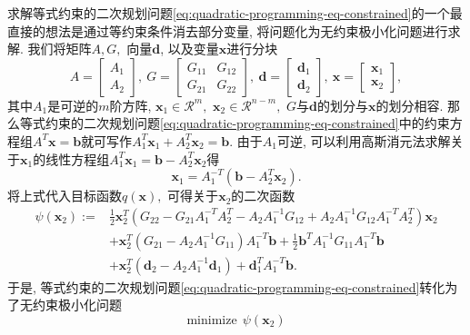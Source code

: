 \documentclass{SBCbookchapter}
\newcommand{\V}[1]{{\bm{#1}}}
\newcommand{\R}{\mathcal{R}}
\numberwithin{equation}{section}
\begin{document}
求解等式约束的二次规划问题\eqref{eq:quadratic-programming-eq-constrained}的一个最直接的想法是通过等约束条件消去部分变量, 将问题化为无约束极小化问题进行求解. 我们将矩阵$A, G,$ 向量$\V{d}$, 以及变量$\V{x}$进行分块
\begin{equation*}
A = \begin{bmatrix} A_1 \\ A_2 \end{bmatrix}, ~ G = \begin{bmatrix} G_{11} & G_{12} \\ G_{21} & G_{22} \end{bmatrix}, ~ \V{d} = \begin{bmatrix} \V{d}_1 \\ \V{d}_2 \end{bmatrix}, ~ \V{x} = \begin{bmatrix} \V{x}_1 \\ \V{x}_2 \end{bmatrix},
\end{equation*}
其中$A_1$是可逆的$m$阶方阵, $\V{x}_1 \in \R^{m},$ $\V{x}_2 \in \R^{n-m},$ $G$与$\V{d}$的划分与$\V{x}$的划分相容. 那么等式约束的二次规划问题\eqref{eq:quadratic-programming-eq-constrained}中的约束方程组$A^T \V{x} = \V{b}$就可写作$A_1^T \V{x}_1 + A_2^T \V{x}_2 = \V{b}.$ 由于$A_1$可逆, 可以利用高斯消元法求解关于$\V{x}_1$的线性方程组$A_1^T \V{x}_1 = \V{b} - A_2^T \V{x}_2$得
\begin{equation}
\label{eq:quadratic-programming-eq-constrained-subs}
\V{x}_1 = A_1^{-T} (\V{b} - A_2^T \V{x}_2).
\end{equation}
将上式代入目标函数$q(\V{x}),$ 可得关于$\V{x}_2$的二次函数
\begin{equation}
\begin{aligned}
\psi (\V{x}_2) := & \frac{1}{2} \V{x}_2^T \left( G_{22} - G_{21} A_1^{-T} A_2^T - A_2 A_1^{-1} G_{12} + A_2 A_1^{-1} G_{12} A_1^{-T} A_2^T \right) \V{x}_2 \\
& + \V{x}_2^T \left( G_{21} - A_2 A_1^{-1} G_{11} \right) A_1^{-T} \V{b} + \frac{1}{2} \V{b}^T A_1^{-1} G_{11} A_1^{-T} \V{b} \\
& + \V{x}_2^T \left( \V{d}_2 - A_2 A_1^{-1} \V{d}_1 \right) + \V{d}_1^T A_1^{-T} \V{b}.
\end{aligned}
\end{equation}
于是, 等式约束的二次规划问题\eqref{eq:quadratic-programming-eq-constrained}转化为了无约束极小化问题
\begin{equation*}
\text{minimize} ~~ \psi(\V{x}_2)
\end{equation*}
\end{document}
